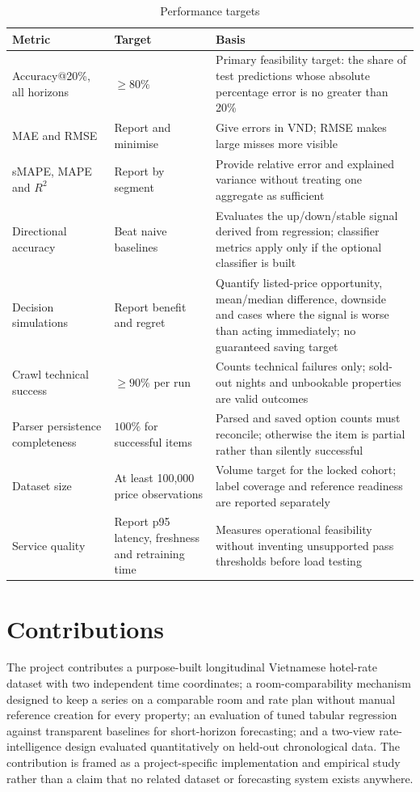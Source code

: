 \begin{table}[!htbp]
\centering
\caption{Performance targets}
\label{tab:targets}
\begin{tabular}{|p{3.8cm}|p{2.6cm}|p{7.0cm}|}
\hline
\textbf{Metric} & \textbf{Target} & \textbf{Basis} \\
\hline
Accuracy@20\%, all horizons & $\geq 80\%$ & Primary feasibility target: the share of test predictions whose absolute percentage error is no greater than 20\% \\
\hline
MAE and RMSE & Report and minimise & Give errors in VND; RMSE makes large misses more visible \\
\hline
sMAPE, MAPE and $R^2$ & Report by segment & Provide relative error and explained variance without treating one aggregate as sufficient \\
\hline
Directional accuracy & Beat naive baselines & Evaluates the up/down/stable signal derived from regression; classifier metrics apply only if the optional classifier is built \\
\hline
Decision simulations & Report benefit and regret & Quantify listed-price opportunity, mean/median difference, downside and cases where the signal is worse than acting immediately; no guaranteed saving target \\
\hline
Crawl technical success & $\geq 90\%$ per run & Counts technical failures only; sold-out nights and unbookable properties are valid outcomes \\
\hline
Parser persistence completeness & $100\%$ for successful items & Parsed and saved option counts must reconcile; otherwise the item is partial rather than silently successful \\
\hline
Dataset size & At least 100,000 price observations & Volume target for the locked cohort; label coverage and reference readiness are reported separately \\
\hline
Service quality & Report p95 latency, freshness and retraining time & Measures operational feasibility without inventing unsupported pass thresholds before load testing \\
\hline
\end{tabular}
\end{table}

\section{Contributions}

The project contributes a purpose-built longitudinal Vietnamese hotel-rate dataset with two independent time coordinates; a room-comparability mechanism designed to keep a series on a comparable room and rate plan without manual reference creation for every property; an evaluation of tuned tabular regression against transparent baselines for short-horizon forecasting; and a two-view rate-intelligence design evaluated quantitatively on held-out chronological data. The contribution is framed as a project-specific implementation and empirical study rather than a claim that no related dataset or forecasting system exists anywhere.

\clearpage
